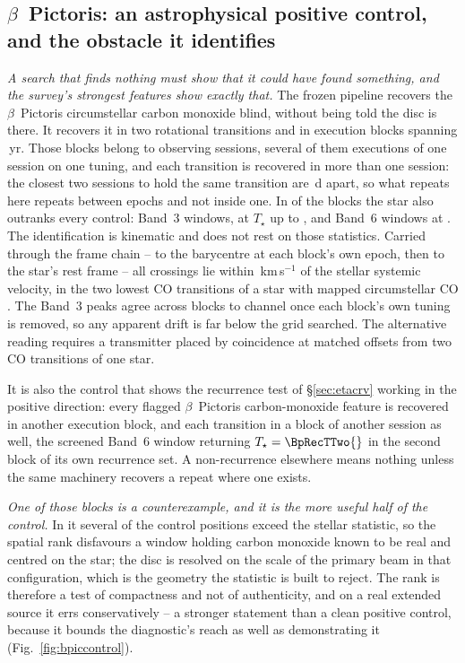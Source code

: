 \subsection{$\beta$~Pictoris: an astrophysical positive control, and the
obstacle it identifies} \label{sec:bpicval}

\emph{A search that finds nothing must show that it could have found
something, and the survey's strongest features show exactly that.} The
frozen pipeline recovers the $\beta$~Pictoris circumstellar carbon monoxide
blind, without being told the disc is there. It recovers it in two
rotational transitions and in \CsBpCoBlocks{} execution
blocks spanning \BpBaselineYr\,yr. Those blocks belong to \CsBpCoSess{}
observing sessions, several of them executions of one session on one
tuning, and each transition is recovered in more than one session: the
closest two sessions to hold the same transition are \CsBpCoSepMinD\,d
apart, so what repeats here repeats between epochs and not inside one.
In \NStageOneBpicEb{} of the blocks the star also outranks every control:
\BpicNFlagThree{} Band~3 windows, at $T_\star$ up to \BpicBThreeTsym, and
\BpicNFlagSix{} Band~6 windows at \BpicBSixTsym. The identification is kinematic and does not rest on those
statistics. Carried through the frame chain -- to the barycentre at each
block's own epoch, then to the star's rest frame -- all \BpicPanelNCo{}
crossings lie within \BpicDvCoHi\,km\,s$^{-1}$ of the stellar systemic
velocity, in the two lowest CO transitions of a star with mapped
circumstellar CO \citep{Dent2014,Matra2017}. The Band~3 peaks agree across blocks to
\BpRecThreeTuneChanMax{} channel once each block's own tuning is removed, so
any apparent drift is far below the grid searched. The alternative reading
requires a transmitter placed by coincidence at matched offsets from two CO
transitions of one star.

It is also the control that shows the recurrence test of
\S\ref{sec:etacrv} working in the positive direction: every flagged
$\beta$~Pictoris carbon-monoxide feature is recovered in another execution
block, and each transition in a block of another session as well, the
screened Band~6 window returning
$T_\star=\BpRecTTwo{}$ in the second block of its own recurrence set. A
non-recurrence elsewhere means nothing unless the same machinery recovers a
repeat where one exists.

\emph{One of those blocks is a counterexample, and it is the more useful half
of the control.} In it several of the \NCtrl{} control positions exceed the
stellar statistic, so the spatial rank disfavours a window holding carbon
monoxide known to be real and centred on the star; the disc is resolved on
the scale of the primary beam in that configuration, which is the geometry
the statistic is built to reject. The rank is therefore a test of
compactness and not of authenticity, and on a real extended source it errs
conservatively -- a stronger statement than a clean positive control, because
it bounds the diagnostic's reach as well as demonstrating it
(Fig.~\ref{fig:bpiccontrol}).

